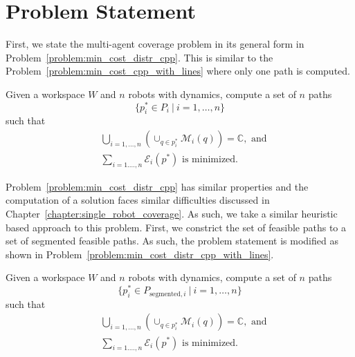 \documentclass[../main.tex]{subfiles}
\begin{document}
\section{Problem Statement}
\label{sec:multi_problem_statement}

First, we state the multi-agent coverage problem in its general form in Problem~\ref{problem:min_cost_distr_cpp}. This is similar to the Problem~\ref{problem:min_cost_cpp_with_lines} where only one path is computed.

\begin{problem}
\label{problem:min_cost_distr_cpp}
	Given a workspace $W$ and $n$ robots with dynamics, compute a set of $n$ paths
	\begin{equation}
		\{p^*_i\in P_{i}\ |\ i=1,\dots,n\}
	\end{equation}
such that
	\begin{equation}
	\begin{aligned}
		& \bigcup_{i=1,\dots,n}(\cup_{q\in p^*_i}\mathcal{M}_i(q))=\mathbb{C},\text{ and}\\
		& \sum_{i=1.\dots,n}\mathcal{E}_i(p^*)\text{ is minimized}.
	\end{aligned}
	\end{equation}
\end{problem}

Problem~\ref{problem:min_cost_distr_cpp} has similar properties and the computation of a solution faces similar difficulties discussed in Chapter~\ref{chapter:single_robot_coverage}. As such, we take a similar heuristic based approach to this problem. First, we constrict the set of feasible paths to a set of segmented feasible paths. As such, the problem statement is modified as shown in Problem~\ref{problem:min_cost_distr_cpp_with_lines}.

\begin{problem}
\label{problem:min_cost_distr_cpp_with_lines}
	Given a workspace $W$ and $n$ robots with dynamics, compute a set of $n$ paths
	\begin{equation}
		\{p^*_i\in P_{\text{segmented},i}\ |\ i=1,\dots,n\}
	\end{equation}
such that
	\begin{equation}
	\begin{aligned}
		& \bigcup_{i=1,\dots,n}(\cup_{q\in p^*_i}\mathcal{M}_i(q))=\mathbb{C},\text{ and}\\
		& \sum_{i=1.\dots,n}\mathcal{E}_i(p^*)\text{ is minimized}.
	\end{aligned}
	\end{equation}
\end{problem}
\end{document}
